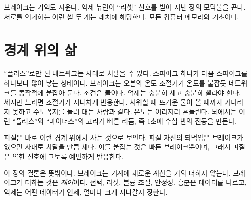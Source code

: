 브레이크는 기억도 지운다. 억제 뉴런이 “리셋” 신호를 받아 지난 장의 모닥불을 끈다. 서로를 억제하는 이런 셀 두 개는 래치에 해당한다. 모든 컴퓨터 메모리의 기초이다.

\section*{경계 위의 삶}

“플러스”로만 된 네트워크는 사태로 치달을 수 있다. 스파이크 하나가 다음 스파이크를 하나보다 많이 낳는 상태이다. 브레이크는 오븐의 온도 조절기가 온도를 붙잡듯 네트워크를 동작점에 붙잡아 둔다. 조건은 둘이다. 억제는 충분히 세고 충분히 빨라야 한다. 세지만 느리면 조절기가 지나치게 반응한다. 샤워할 때 뜨거운 물이 올 때까지 기다리지 못하고 수도꼭지를 돌려 대는 사람과 같다. 온도는 이리저리 흔들린다. 뇌에서는 이런 “플러스”와 “마이너스”의 고리가 빠른 리듬, 즉 1초에 수십 번의 진동을 만든다.

피질은 바로 이런 경계 위에서 사는 것으로 보인다. 피질 자신의 되먹임은 브레이크가 없으면 사태로 치달을 만큼 세다. 이를 붙잡는 것은 빠른 브레이크뿐이며, 그래서 피질은 약한 신호에 그토록 예민하게 반응한다.

이 장의 결론은 뜻밖이다. 브레이크는 기계에 새로운 계산을 거의 더하지 않는다. 브레이크가 더하는 것은 \emph{제어}이다. 선택, 리셋, 볼륨 조절, 안정성. 흥분은 데이터를 나르고, 억제는 어떤 데이터가 언제, 얼마나 크게 지나갈지 정한다.

